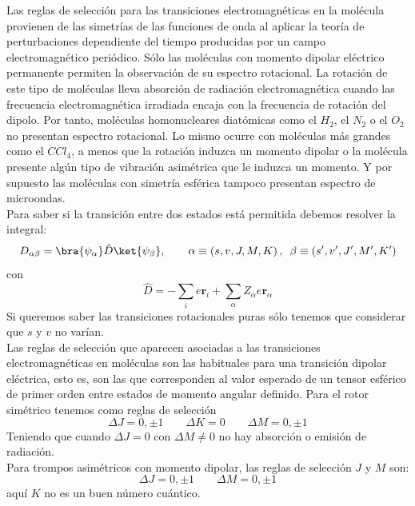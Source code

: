 \documentclass[a4paper]{article}
\begin{document}
Las reglas de selección para las transiciones electromagnéticas en la molécula provienen de las simetrías de las funciones de onda al aplicar la teoría de perturbaciones dependiente del tiempo producidas por un campo electromagnético periódico.
Sólo las moléculas con momento dipolar eléctrico permanente permiten la observación de su espectro rotacional. La rotación de este tipo de moléculas lleva absorción de radiación electromagnética cuando las frecuencia electromagnética irradiada encaja con la frecuencia de rotación del dipolo. Por tanto, moléculas homonucleares diatómicas como el $H_2$, el $N_2$ o el $O_2$ no presentan espectro rotacional. Lo mismo ocurre con moléculas más grandes como el $CCl_4$, a menos que la rotación induzca un momento dipolar o la molécula presente algún tipo de vibración asimétrica que le induzca un momento. Y por supuesto las moléculas con simetría esférica tampoco presentan espectro de microondas.\\
 
Para saber si la transición entre dos estados está permitida debemos resolver la integral:
\begin{equation}
D_{\alpha\beta}=\bra{\psi_\alpha}\hat D\ket{\psi_\beta},\qquad \alpha \equiv \left(s,v,J,M,K\right), \,\ \beta \equiv \left(s',v',J',M',K'\right)
\end{equation}
con
\begin{equation}
\hat D = -\sum_i e \boldsymbol r_i + \sum_\alpha Z_\alpha e \boldsymbol r_\alpha
\end{equation}
Si queremos saber las transiciones rotacionales puras sólo tenemos que considerar que $s$ y $v$ no varían.\\

Las reglas de selección que aparecen asociadas a las transiciones electromagnéticas en moléculas son las habituales para una transición dipolar eléctrica, esto es, son las que corresponden al valor esperado de un tensor esférico de primer orden entre estados de momento angular definido.
Para el rotor simétrico tenemos como reglas de selección
\begin{equation}
\Delta J = 0,\pm 1 \qquad\Delta K =0 \qquad \Delta M = 0, \pm 1
\end{equation}
Teniendo que cuando $\Delta J = 0$ con $\Delta M \neq 0$ no hay absorción o emisión de radiación.\\
Para trompos asimétricos con momento dipolar, las reglas de selección $J$ y $M$ son:
\begin{equation}
\Delta J = 0, \pm 1 \qquad\Delta M = 0, \pm 1
\end{equation}
aquí $K$ no es un buen número cuántico. \\
\end{document}
